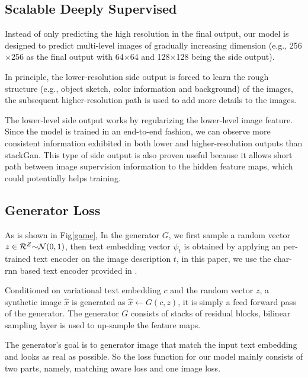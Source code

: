 \documentclass[10pt,twocolumn,letterpaper]{article}
\begin{document}
\subsection{Scalable Deeply Supervised}
Instead of only predicting the high resolution in the final output, our model is designed to predict multi-level images of gradually increasing dimension (e.g., 256$\times$256 as the final output with 64$\times$64 and 128$\times$128 being the side output). 
 
In principle, the lower-resolution side output is forced to learn the rough structure (e.g., object sketch, color information and background) of the images, the subsequent higher-resolution path is used to add more details to the images. 

The lower-level side output works by regularizing the lower-level image feature. Since the model is trained in an end-to-end fashion, we can observe more consistent information exhibited in both lower and higher-resolution outputs than stackGan\cite{han2017stackgan}. This type of side output is also proven useful because it allows short path between image supervision information to the hidden feature maps, which could potentially helps training.

\subsection{Generator Loss}
As is shown in Fig\ref{game}, In the generator $G$, we first sample a random vector $z\in \mathcal{R}^{Z} \scriptsize{\sim} \mathcal{N}(0,1)$, then text embedding vector $\psi_{t}$ is obtained by applying an per-trained text encoder on the image description $t$, in this paper, we use the char-rnn based text encoder provided in \cite{reed2016generative}. 

Conditioned on variational text embedding $c$ and the random vector $z$, a synthetic image $\hat{x}$ is generated as $\hat{x}\leftarrow G(c,z)$, it is simply a feed forward pass of the generator. The generator $G$ consists of stacks of residual blocks, bilinear sampling layer is used to up-sample the feature maps. 

The generator's goal is to generator image that match the input text embedding and looks as real as possible. So the loss function for our model mainly consists of two parts, namely, matching aware loss and one image loss.  
\end{document}
